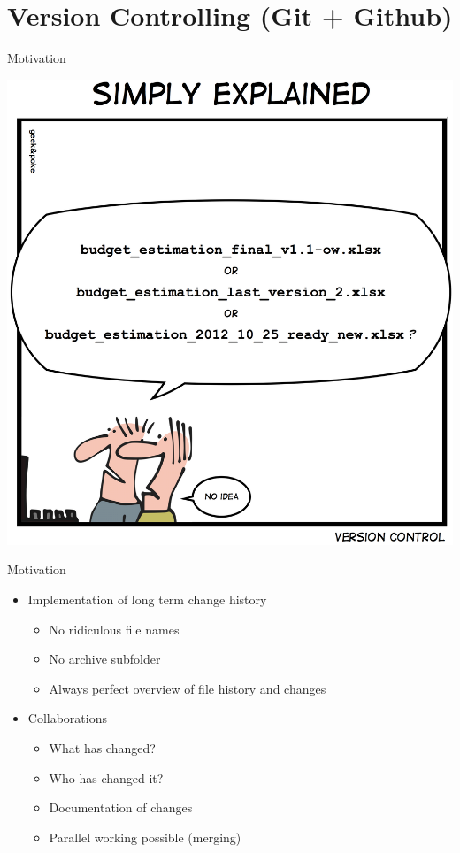 \documentclass[xcolor=table]{beamer}\usepackage[]{graphicx}\usepackage[]{color}
\begin{document}
\section{Version Controlling (Git + Github)}
\begin{frame}{Motivation}
\begin{center}
\includegraphics[height=.75\textheight]{why_version_control.jpg}
\end{center}
\end{frame}

\begin{frame}{Motivation}
\begin{itemize}
  \item Implementation of long term change history 
  \begin{itemize}
  \item No ridiculous file names
  \item No archive subfolder
  \item Always perfect overview of file history and changes
  \end{itemize}
  \item Collaborations
  \begin{itemize}
  \item What has changed?
  \item Who has changed it?
  \item Documentation of changes
  \item Parallel working possible (merging)
  \end{itemize}
\end{itemize}
\end{frame}
\end{document}
